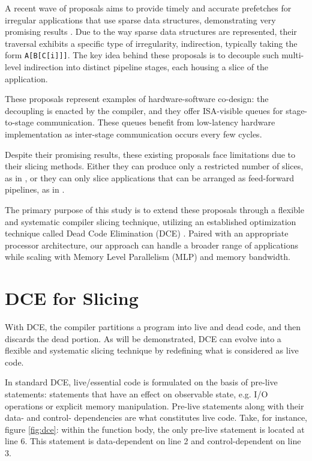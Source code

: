 \documentclass{acaces}
\begin{document}
A recent wave of proposals aims to provide timely and accurate prefetches for irregular applications that use sparse data structures,
demonstrating very promising results \cite{Manocha2021, Nguyen2023}.
Due to the way sparse data structures are represented,
their traversal exhibits a specific type of irregularity, indirection, typically taking the form \texttt{A[B[C[i]]]}.
The key idea behind these proposals is to decouple such multi-level indirection into distinct pipeline stages, each housing a slice of the application.

These proposals represent examples of hardware-software co-design:
the decoupling is enacted by the compiler, and they offer ISA-visible queues for stage-to-stage communication.
These queues benefit from low-latency hardware implementation as inter-stage communication occurs every few cycles.

Despite their promising results, these existing proposals face limitations due to their slicing methods.
Either they can produce only a restricted number of slices, as in \cite{Manocha2021},
or they can only slice applications that can be arranged as feed-forward pipelines, as in \cite{Nguyen2023}.

The primary purpose of this study is to extend these proposals through a flexible and systematic compiler slicing technique,
utilizing an established optimization technique called Dead Code Elimination (DCE) \cite{cytron_efficiently_1991}.
Paired with an appropriate processor architecture, our approach can handle a broader range of applications while scaling
with Memory Level Parallelism (MLP) and memory bandwidth.

\section{DCE for Slicing}

With DCE, the compiler partitions a program into live and dead code, and then discards the dead portion.
As will be demonstrated, DCE can evolve into a flexible and systematic slicing technique by redefining what is considered as live code.

In standard DCE, live/essential code is formulated on the basis of pre-live statements:
statements that have an effect on observable state, e.g. I/O operations or explicit memory manipulation.
Pre-live statements along with their data- and control- dependencies are what constitutes live code.
Take, for instance, figure \ref{fig:dce}: within the function body, the only pre-live statement is located at line 6.
This statement is data-dependent on line 2 and control-dependent on line 3.
\end{document}
